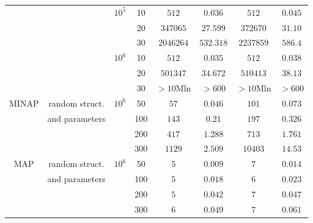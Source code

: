 \documentclass{article}
\begin{document}
\begin{table}[ht]
\begin{center}
\begin{tabular}{cccc|cc|cc}
              &                & $10^{5}$  & 10    & $512$                       & $0.036$                     & $512$     & $0.045$ \\
              &                &           & 20    & $347065$                    & $27.599$                    & $372670$  & $31.10$ \\
              &                &           & 30    & $2046264$                   & $532.318$                   & $2237859$ & $586.4$ \\
              &                & $10^{6}$  & 10    & $512$                       & $0.035$                     & $512$     & $0.038$ \\
              &                &           & 20    & $501347$                    & $34.672$                    & $510413$  & $38.13$ \\
              &                &           & 30    & $>10$Mln                    & $>600$                      & $>10$Mln  & $>600$  \\
      MINAP   & random struct. & $10^{6}$  & 50    & $57$                        & $0.046$                     & $101$     & $0.073$ \\
              & and parameters &           & 100   & $143$                       & $0.21$                      & $197$     & $0.326$ \\
              &                &           & 200   & $417$                       & $1.288$                     & $713$     & $1.761$ \\
              &                &           & 300   & $1129$                      & $2.509$                     & $10403$   & $14.53$ \\
      MAP     & random struct. & $10^{6}$  & 50    & $5$                         & $0.009$                     & $7$       & $0.014$ \\
              & and parameters &           & 100   & $5$                         & $0.018$                     & $6$       & $0.023$ \\
              &                &           & 200   & $5$                         & $0.042$                     & $7$       & $0.047$ \\
              &                &           & 300   & $6$                         & $0.049$                     & $7$       & $0.061$ \\
      \hline
    \end{tabular}
  \end{center}
\end{table}

\lipsum[1-4]
\end{document}

